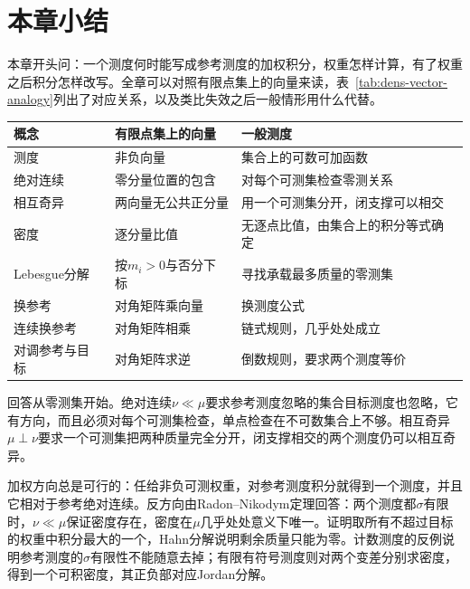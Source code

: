 \section{本章小结}
\label{sec:dens-summary}

本章开头问：一个测度何时能写成参考测度的加权积分，权重怎样计算，有了权重之后积分怎样改写。全章可以对照有限点集上的向量来读，表~\ref{tab:dens-vector-analogy}列出了对应关系，以及类比失效之后一般情形用什么代替。

\begin{BookInlineTable}
\small
\begin{tabular}{@{}>{\RaggedRight\arraybackslash}p{22mm}>{\RaggedRight\arraybackslash}p{}>{\RaggedRight\arraybackslash}p{}@{}}
\toprule
概念 & 有限点集上的向量 & 一般测度\\
\midrule
测度 & 非负向量 & 集合上的可数可加函数\\
绝对连续 & 零分量位置的包含 & 对每个可测集检查零测关系\\
相互奇异 & 两向量无公共正分量 & 用一个可测集分开，闭支撑可以相交\\
密度 & 逐分量比值 & 无逐点比值，由集合上的积分等式确定\\
Lebesgue分解 & 按$m_i>0$与否分下标 & 寻找承载最多质量的零测集\\
换参考 & 对角矩阵乘向量 & 换测度公式\\
连续换参考 & 对角矩阵相乘 & 链式规则，几乎处处成立\\
对调参考与目标 & 对角矩阵求逆 & 倒数规则，要求两个测度等价\\
\bottomrule
\end{tabular}
\caption{密度理论的向量类比。}
\label{tab:dens-vector-analogy}
\end{BookInlineTable}

回答从零测集开始。绝对连续$\nu\ll\mu$要求参考测度忽略的集合目标测度也忽略，它有方向，而且必须对每个可测集检查，单点检查在不可数集合上不够。相互奇异$\mu\perp\nu$要求一个可测集把两种质量完全分开，闭支撑相交的两个测度仍可以相互奇异。

加权方向总是可行的：任给非负可测权重，对参考测度积分就得到一个测度，并且它相对于参考绝对连续。反方向由Radon–Nikodym定理回答：两个测度都$\sigma$有限时，$\nu\ll\mu$保证密度存在，密度在$\mu$几乎处处意义下唯一。证明取所有不超过目标的权重中积分最大的一个，Hahn分解说明剩余质量只能为零。计数测度的反例说明参考测度的$\sigma$有限性不能随意去掉；有限有符号测度则对两个变差分别求密度，得到一个可积密度，其正负部对应Jordan分解。

